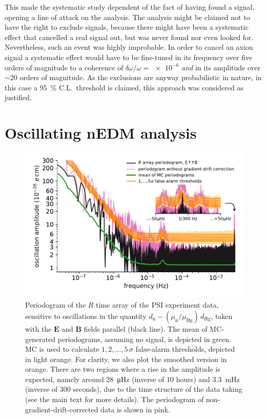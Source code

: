 This made the systematic study dependent of the fact of having found a signal, opening a line of attack on the analysis.
The analysis might be claimed not to have the right to exclude signals, because there might have been a systematic effect that cancelled a real signal out, but was never found nor even looked for.
Nevertheless, such an event was highly improbable.
In order to cancel an axion signal a systematic effect would have to be fine-tuned in its frequency over five orders of magnitude to a coherence of $\delta \omega / \omega = \num{e-6}$ \emph{and} in its amplitude over $\sim 20$ orders of magnitude.
As the exclusions are anyway probabilistic in nature, in this case a \SI{95}{\percent} C.L.\ threshold is claimed, this approach was considered as justified.




\section{Oscillating nEDM analysis}
\begin{figure}
  \centering
  \includegraphics[width=\linewidth]{gfx/axions/detection_psi_inset_gc.pdf}
  \caption{Periodogram of the $R$ time array of the PSI experiment data, sensitive to oscillations in the quantity $d_\mathrm{n} - \left( \mu_\mathrm{n} / \mu_\mathrm{Hg} \right) \, d_\mathrm{Hg}$, taken with the $\boldsymbol{E}$ and $\boldsymbol{B}$ fields parallel (black line).
  The mean of MC-generated periodograms, assuming no signal, is depicted in green. MC is used to calculate $1,2,…,5\,\sigma$ false-alarm thresholds, depicted in light orange.
  For clarity, we also plot the smoothed version in orange.
  There are two regions where a rise in the amplitude is expected, namely around \SI{28}{\micro\hertz} (inverse of 10 hours) and \SI{3.3}{\milli\hertz} (inverse of 300 seconds), due to the time structure of the data taking (see the main text for more details). The periodogram of non-gradient-drift-corrected data is shown in pink.}\label{fig:axions_PSI_detection}
\end{figure}


